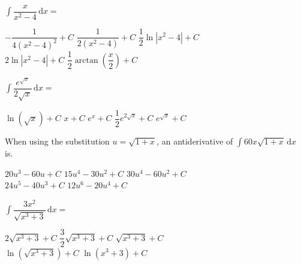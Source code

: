 \begin{questions}
    \question $\int \dfrac{x}{x^2 - 4} \,\mathrm{d}x = $ \\

    \begin{oneparchoices}
        \choice $-\dfrac{1}{4\left(x^2 - 4\right)^2} + C$
        \choice $\dfrac{1}{2\left(x^2 - 4\right)} + C$
        \choice $\dfrac{1}{2}\ln |x^2 - 4| + C$ \\[11pt]
        \makebox[0.22\textwidth] \choice $2\ln |x^2 - 4| + C$ 
        \makebox[0.22\textwidth] \choice $\dfrac{1}{2}\arctan \left(\dfrac{x}{2}\right) + C$
    \end{oneparchoices} \par \horizontalline

    \question $\int \dfrac{e^{\sqrt{x}}}{2\sqrt{x}} \,\mathrm{d}x = $ \\

    \begin{oneparchoices}
        \choice $\ln \left(\sqrt{x}\right) + C$
        \choice $x + C$
        \choice $e^x + C$
        \choice $\dfrac{1}{2}e^{2\sqrt{x}} + C$
        \choice $e^{\sqrt{x}} + C$
    \end{oneparchoices} \par \horizontalline

    \question When using the substitution $u = \sqrt{1 + x}$, an antiderivative of $\int 60x\sqrt{1 + x} \,\mathrm{d}x$ is. \\

    \begin{oneparchoices}
        \choice $20u^3 - 60u + C$ 
        \choice $15u^4 - 30u^2 + C$
        \choice $30u^4 - 60u^2 + C$ \\[11pt]
        \makebox[0.22\textwidth] \choice $24u^5 - 40u^3 + C$
        \makebox[0.22\textwidth] \choice $12u^6 - 20u^4 + C$
    \end{oneparchoices} \par \horizontalline

    \question $\int \dfrac{3x^2}{\sqrt{x^3 + 3}} \,\mathrm{d}x = $ \\

    \begin{oneparchoices}
        \choice $2\sqrt{x^3 + 3} + C$ 
        \choice $\dfrac{3}{2}\sqrt{x^3 + 3} + C$
        \choice $\sqrt{x^3 + 3} + C$ \\[11pt]
        \makebox[0.22\textwidth] \choice $\ln \left(\sqrt{x^3 + 3}\right) + C$
        \makebox[0.21\textwidth] \choice $\ln \left(x^3 + 3\right) + C$
    \end{oneparchoices} \par \horizontalline


\end{questions}
